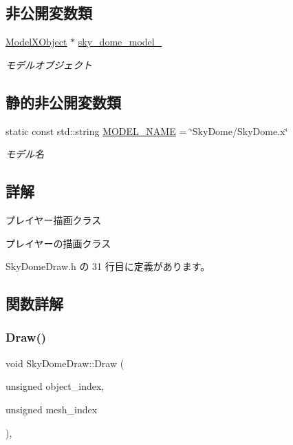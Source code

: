\subsection*{非公開変数類}
\begin{DoxyCompactItemize}
\item 
\mbox{\hyperlink{class_model_x_object}{Model\+X\+Object}} $\ast$ \mbox{\hyperlink{class_sky_dome_draw_a2453fb04f979443c61acc10eafa183aa}{sky\+\_\+dome\+\_\+model\+\_\+}}
\begin{DoxyCompactList}\small\item\em モデルオブジェクト \end{DoxyCompactList}\end{DoxyCompactItemize}
\subsection*{静的非公開変数類}
\begin{DoxyCompactItemize}
\item 
static const std\+::string \mbox{\hyperlink{class_sky_dome_draw_a366fd9d1040d77ddac71e335f10f2c29}{M\+O\+D\+E\+L\+\_\+\+N\+A\+ME}} = \char`\"{}Sky\+Dome/Sky\+Dome.\+x\char`\"{}
\begin{DoxyCompactList}\small\item\em モデル名 \end{DoxyCompactList}\end{DoxyCompactItemize}


\subsection{詳解}
プレイヤー描画クラス 

プレイヤーの描画クラス 

 Sky\+Dome\+Draw.\+h の 31 行目に定義があります。



\subsection{関数詳解}
\mbox{\label{class_sky_dome_draw_a42364ea42618cbab588d55050edfe95a}} 
\subsubsection{\texorpdfstring{Draw()}{Draw()}}
{\footnotesize\ttfamily void Sky\+Dome\+Draw\+::\+Draw (\begin{DoxyParamCaption}\item[{unsigned}]{object\+\_\+index,  }\item[{unsigned}]{mesh\+\_\+index }\end{DoxyParamCaption})\hspace{0.3cm}{\ttfamily [override]}, {\ttfamily [virtual]}}



